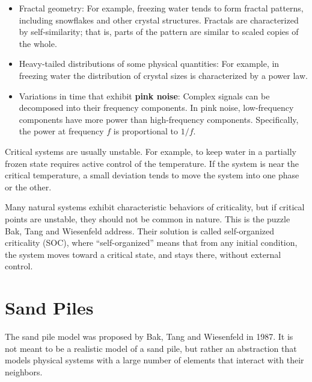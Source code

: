 \documentclass[12pt]{book}
\theoremstyle{exercise}
\begin{document}
\begin{itemize}

\item Fractal geometry: For example, freezing water tends to form
  fractal patterns, including snowflakes and other crystal
  structures.  Fractals are characterized by self-similarity; that is,
  parts of the pattern are similar to scaled copies of the whole.


\item Heavy-tailed distributions of some physical quantities: For
  example, in freezing water the distribution of crystal sizes is
  characterized by a power law.


\item Variations in time that exhibit {\bf pink noise}:  Complex
  signals can be decomposed into their frequency components.  In pink
  noise, low-frequency components have more power than high-frequency
  components.  Specifically, the power at frequency $f$ is
  proportional to $1/f$.


\end{itemize}

Critical systems are usually unstable.  For example, to keep water in
a partially frozen state requires active control of the temperature.
If the system is near the critical temperature, a small deviation
tends to move the system into one phase or the other.


Many natural systems exhibit characteristic behaviors of criticality,
but if critical points are unstable, they should not be common in
nature.  This is the puzzle Bak, Tang and Wiesenfeld address.  Their
solution is called self-organized criticality (SOC), where
``self-organized'' means that from any initial condition, the system
moves toward a critical state, and stays there, without
external control.


\section{Sand Piles}

The sand pile model was proposed by Bak, Tang and Wiesenfeld in 1987.
It is not meant to be a realistic model of a sand pile, but rather an
abstraction that models physical systems with a large number of
elements that interact with their neighbors.
\end{document}
